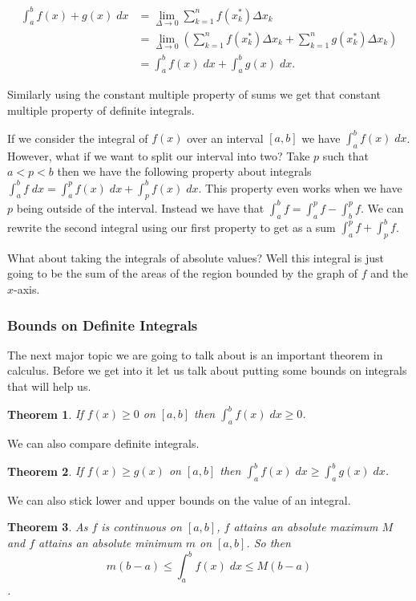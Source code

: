 \documentclass[12pt,reqno]{article}
\newtheorem{Theorem}{Theorem}
\theoremstyle{definition}
\begin{document}
\begin{align*}
	\int_{a}^{b} f(x) + g(x) \;dx &= \lim_{\Delta \to 0} \sum_{k = 1}^{n} f(x_{k}^{*}) \Delta x_k \\ &= \lim_{\Delta \to 0} \left(\sum_{k = 1}^{n} f(x_{k}^*) \Delta x_k + \sum_{k = 1}^{n} g(x_{k}^*) \Delta x_k \right) \\
	&= \int_{a}^{b} f(x) \; dx + \int_{a}^{b} g(x) \; dx.
\end{align*}

Similarly using the constant multiple property of sums we get that constant multiple property of definite integrals. 

If we consider the integral of $f(x)$ over an interval $[a, b]$ we have $\int_{a}^{b} f(x) \; dx$. However, what if we want to split our interval into two? Take $p$ such that $a < p < b$ then we have the following property about integrals $\int_{a}^{b} f \; dx = \int_{a}^{p} f(x) \; dx + \int_{p}^{b} f(x) \; dx$. This property even works when we have $p$ being outside of the interval. Instead we have that $\int_{a}^{b} f = \int_{a}^{p} f - \int_{b}^{p} f$. We can rewrite the second integral using our first property to get as a sum $\int_{a}^{p} f + \int_{p}^{b} f$. 

What about taking the integrals of absolute values? Well this integral is just going to be the sum of the areas of the region bounded by the graph of $f$ and the $x$-axis. 

\subsubsection{Bounds on Definite Integrals}

The next major topic we are going to talk about is an important theorem in calculus. Before we get into it let us talk about putting some bounds on integrals that will help us. 

\begin{Theorem}
	If $f(x) \geq 0$ on $[a, b]$ then $\int_{a}^{b} f(x) \; dx \geq 0$. 
\end{Theorem}

We can also compare definite integrals. 
\begin{Theorem}
	If $f(x) \geq g(x)$ on $[a, b]$ then $\int_{a}^{b} f(x) \; dx \geq \int_{a}^{b} g(x) \; dx$. 
\end{Theorem}

We can also stick lower and upper bounds on the value of an integral.
\begin{Theorem}
	As $f$ is continuous on $[a, b]$, $f$ attains an absolute maximum $M$ and $f$ attains an absolute minimum $m$ on $[a, b]$. So then $$m(b - a) \leq \int_{a}^{b} f(x) \; dx \leq M(b - a)$$. 
\end{Theorem}
\end{document}

